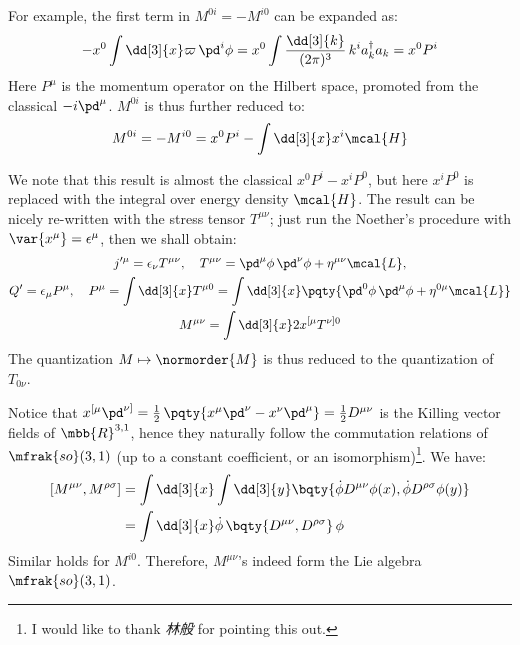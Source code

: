 \documentclass[a4paper,10pt]{article}
\begin{document}
\begin{itemize}
	For example, the first term in $M^{0i} = -M^{i0}$ can be expanded as:
	\begin{equation}
	\begin{aligned}
		- x^0 \int \dd[3]{x}
			\varpi\,\pd^i \phi
		= x^0 \int \frac{\dd[3]{k}}{(2\pi)^3}\,
				k^i a^\dagger_k a_k
		= x^0 P^i
	\end{aligned}
	\end{equation}
	Here $P^\mu$ is the momentum operator on the Hilbert space, promoted from the classical $-i\pd^\mu$. $M^{0i}$ is thus further reduced to:
	\begin{equation}
		M^{0i} = -M^{i0}
		= x^0 P^i - \int \dd[3]{x}
			x^i \mcal{H}
	\end{equation}
	
	We note that this result is almost the classical $
		x^0 P^i - x^i P^0
	$, but here $x^i P^0$ is replaced with the integral over energy density $\mcal{H}$. The result can be nicely re-written with the stress tensor $T^{\mu\nu}$; just run the Noether's procedure with $\var{x^\mu} = \epsilon^\mu$, then we shall obtain:
	\begin{equation}
	\begin{gathered}
		j'^\mu
		= \epsilon_\nu T^{\mu\nu},
	\quad
		T^{\mu\nu}
		= \pd^\mu\phi\,\pd^\nu\phi
			+ \eta^{\mu\nu} \mcal{L},
	\\
		Q' = \epsilon_\mu P^\mu,
	\quad
		P^\mu
		= \int \dd[3]{x} T^{\mu 0}
		= \int \dd[3]{x} \pqty{
			\pd^0\phi\,\pd^\mu\phi
			+ \eta^{0\mu} \mcal{L}
		}
	\\
		M^{\mu\nu}
		= \int \dd[3]{x}
			2x^{[\mu} T^{\nu]0}
	\end{gathered}
	\end{equation}
	The quantization $M\mapsto \normorder{M}$ is thus reduced to the quantization of $T_{0\nu}$. 
	
	
	Notice that $
		x^{[\mu} \pd^{\nu]}
		= \frac{1}{2}\,\pqty{
			x^\mu \pd^\nu - x^\nu \pd^\mu
		} = \frac{1}{2} D^{\mu\nu}
	$ is the Killing vector fields of $\mbb{R}^{3,1}$, hence they naturally follow the commutation relations of $\mfrak{so}(3,1)$ (up to a constant coefficient, or an isomorphism)\footnote{
		I would like to thank \textit{林般} for pointing this out. 
	}. We have:
	\begin{equation}
	\begin{aligned}
		[M^{\mu\nu}, M^{\rho\sigma}]
		&= \int \dd[3]{x}
			\int \dd[3]{y} \bqty{
				\dot{\phi} D^{\mu\nu}\phi(x),
				\dot{\phi} D^{\rho\sigma}\phi(y)
			} \\
		&= \int \dd[3]{x}
			\dot{\phi}\,\bqty{
				 D^{\mu\nu}, D^{\rho\sigma}
			}\,\phi
	\end{aligned}
	\end{equation}
	Similar holds for $M^{i0}$. Therefore, $M^{\mu\nu}$'s indeed form the Lie algebra $\mfrak{so}(3,1)$. 
	\qedfull
	
	\end{itemize}

\printbibliography[%
	,heading = bibintoc
]
\end{document}
